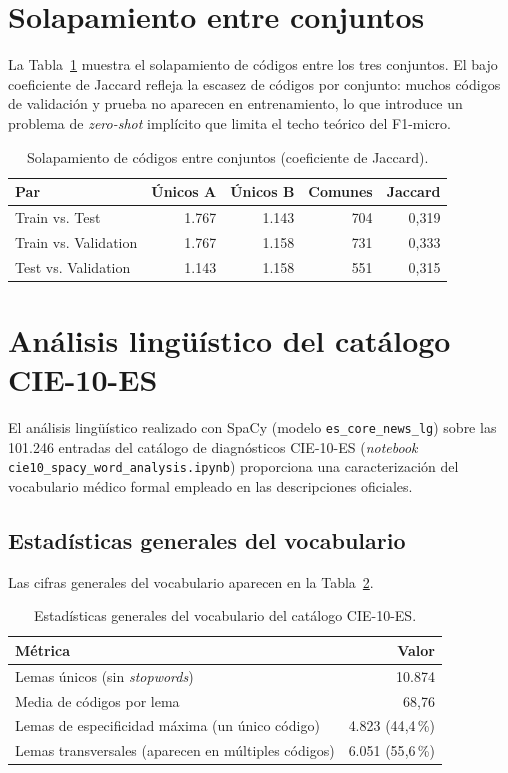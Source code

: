 \section{Solapamiento entre conjuntos}

La Tabla~\ref{tab:jaccard} muestra el solapamiento de códigos entre los tres conjuntos. El bajo coeficiente de Jaccard refleja la escasez de códigos por conjunto: muchos códigos de validación y prueba no aparecen en entrenamiento, lo que introduce un problema de \emph{zero-shot} implícito que limita el techo teórico del F1-micro.

\begin{table}[h]
\centering
\caption{Solapamiento de códigos entre conjuntos (coeficiente de Jaccard).}
\label{tab:jaccard}
\begin{tabular}{lrrrr}
\hline
\textbf{Par} & \textbf{Únicos A} & \textbf{Únicos B} & \textbf{Comunes} & \textbf{Jaccard} \\
\hline
Train vs. Test & 1.767 & 1.143 & 704 & 0{,}319 \\
Train vs. Validation & 1.767 & 1.158 & 731 & 0{,}333 \\
Test vs. Validation & 1.143 & 1.158 & 551 & 0{,}315 \\
\hline
\end{tabular}
\end{table}

\section{Análisis lingüístico del catálogo CIE-10-ES}
\label{sec:analisis-linguistico}

El análisis lingüístico realizado con SpaCy (modelo \texttt{es\_core\_news\_lg}) sobre las 101.246 entradas del catálogo de diagnósticos CIE-10-ES (\emph{notebook} \texttt{cie10\_spacy\_word\_analysis.ipynb}) proporciona una caracterización del vocabulario médico formal empleado en las descripciones oficiales.

\subsection{Estadísticas generales del vocabulario}

Las cifras generales del vocabulario aparecen en la Tabla~\ref{tab:vocab-stats}.

\begin{table}[h]
\centering
\caption{Estadísticas generales del vocabulario del catálogo CIE-10-ES.}
\label{tab:vocab-stats}
\begin{tabular}{lr}
\hline
\textbf{Métrica} & \textbf{Valor} \\
\hline
Lemas únicos (sin \emph{stopwords}) & 10.874 \\
Media de códigos por lema & 68{,}76 \\
Lemas de especificidad máxima (un único código) & 4.823 (44{,}4\,\%) \\
Lemas transversales (aparecen en múltiples códigos) & 6.051 (55{,}6\,\%) \\
\hline
\end{tabular}
\end{table}

